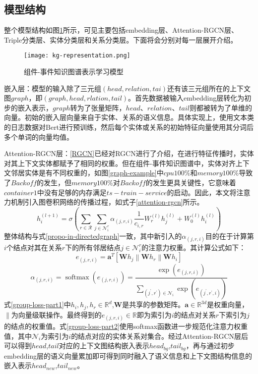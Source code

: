 \subsection{模型结构}
整个模型结构如图\ref{kg-representation}所示，可见主要包括embedding层、Attention-RGCN层、Triple分类层、实体分类层和关系分类层。下面将会分别对每一层展开介绍。
\begin{figure}[htbp]
    \centering
    \texttt{[image: kg-representation.png]}
    \caption{组件-事件知识图谱表示学习模型\label{kg-representation}}
\end{figure}

嵌入层：模型的输入除了三元组$(head, relation, tai)$还有该三元组所在的上下文图$graph$，即$(graph, head,rlation,tail)$。首先数据被输入embedding层转化为初步的嵌入表示，$graph$转为了张量矩阵，$head$、$relation$、$tail$则都被转为了单维的向量。初始的嵌入层向量来自于实体、关系的语义信息。具体实现上，使用文本类的日志数据对Bert\cite{devlin2018bert}进行预训练，然后每个实体或关系的初始特征向量使用其分词后多个单词的向量均值。

Attention-RGCN层：\ref{RGCN}已经对RGCN进行了介绍，在进行特征传播时，实体对其上下文实体都赋予了相同的权重。但在组件-事件知识图谱中，实体对齐上下文邻居实体是有不同权重的，如图\ref{graph-example}中$cpu 100\%$和$memory 100\%$导致了$Backoff$的发生，但$memory 100\%$对$Backoff$的发生更具关键性，它意味着$container1$中没有足够的内存满足$ts-train-service$的启动。因此，本文将注意力机制引入图卷积网络的传播过程，如式子\ref{attention-rgcn}所示。
\begin{equation}
    h_{i}^{(l+1)}=\sigma\left(\sum_{r \in \mathcal{R}} \sum_{j \in \mathcal{N}_{i}^{r}} \alpha_{(j, r, i)} \frac{1}{c_{i, r}} W_{r}^{(l)} h_{j}^{(l)}+W_{0}^{(l)} h_{i}^{(l)}\right)
    \label{attention-rgcn}
\end{equation}
整体结构与式\ref{propo-in-directedgraph}一致，其中新引入的$\alpha_{(j, r, i)}$目的在于计算第$i$个结点对其在关系$r$下的所有邻居结点$j \in \mathcal{N}_{i}^{r}$的注意力权重。其计算公式如下：
\begin{equation}
    e_{(j, r, i)}=\mathbf{a}^{T}\left[\mathbf{W} h_{j}\left\|\mathbf{W} h_{r}\right\| \mathbf{W} h_{i}\right]
    \label{group-loss-part1}
\end{equation}
\begin{equation}
    \alpha_{(j, r, i)}=\operatorname{softmax}\left(e_{(j, r, i)}\right)=\frac{\exp \left(e_{(j, r, i)}\right)}{\sum_{\left(j^{\prime}, r^{\prime}\right) \in \mathcal{N}_{i}} \exp \left(e_{\left(j^{\prime}, r^{\prime}, i\right)}\right)}
    \label{group-loss-part2}
\end{equation}
式\ref{group-loss-part1}中$h_i,h_j,h_r\in\mathbb{R}^{d}$,$\mathbf{W}$是共享的参数矩阵。$\mathbf{a} \in \mathbb{R}^{3 d}$是权重向量，$\|$为向量级联操作。最终得到的$ e_{(j, r, i)} \in \mathbb{R}$即为索引为$i$的结点对关系$r$下索引为$j$的结点的权重值。式\ref{group-loss-part2}使用softmax函数进一步规范化注意力权重值，其中$\mathcal{N}_{i}$为索引为$i$的结点对应的实体关系对集合。经过Attention-RGCN层后可以得到$head$,$tail$对应的上下文图结构嵌入表示$head_{bg}$,$tail_{bg}$，再与通过初步embedding层的语义向量累加即可得到同时融入了语义信息和上下文图结构信息的嵌入表示$head_{new}$,$tail_{new}$。

